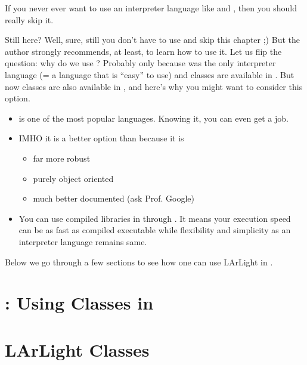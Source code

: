 If you never ever want to use an interpreter language like \python and \CINT, then 
you should really skip it.

Still here? Well, sure, still you don't have to use \python and skip this chapter ;) 
But the author strongly recommends, at least, to learn how to use it.
Let us flip the question: why do we use \CINT?
Probably only because \CINT was the only interpreter language (= a language that is ``easy'' to use) 
and \ROOT classes are available in \CINT. But now \ROOT classes are also available in \python, 
and here's why you might want to consider this option.
\begin{itemize}
\item \python is one of the most popular languages. Knowing it, you can even get a job.
\item IMHO it is a better option than \CINT because it is
      \begin{itemize}
      \item far more robust
      \item purely object oriented
      \item much better documented (ask Prof. Google)
      \end{itemize}
\item You can use compiled libraries in \python through \PyROOT. It means your execution speed can be as fast as compiled executable while flexibility and simplicity as an interpreter language remains same.
\end{itemize}
Below we go through a few sections to see how one can use LArLight in \python.

\section{}
\label{sec:python101}


\section{\PyROOT: Using \ROOT Classes in \python}
\label{sec:pyroot}


\section{LArLight Classes}
\label{sec:larlightwithpython}


